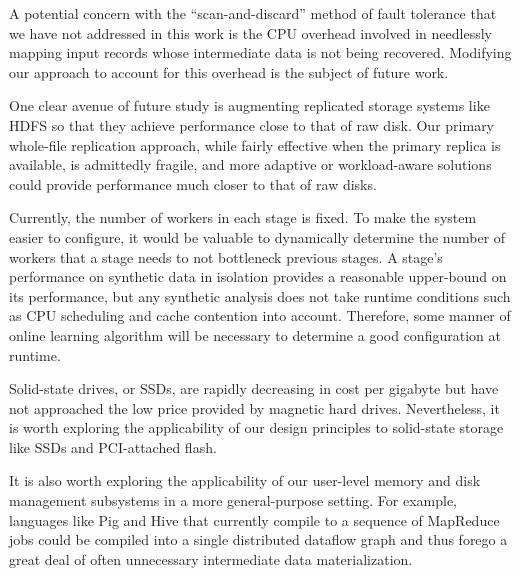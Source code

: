 A potential concern with the ``scan-and-discard'' method of fault tolerance
that we have not addressed in this work is the CPU overhead involved in
needlessly mapping input records whose intermediate data is not being
recovered. Modifying our approach to account for this overhead is the subject
of future work.

One clear avenue of future study is augmenting replicated storage systems like
HDFS so that they achieve performance close to that of raw disk. Our primary
whole-file replication approach, while fairly effective when the primary
replica is available, is admittedly fragile, and more adaptive or
workload-aware solutions could provide performance much closer to that of raw
disks.

Currently, the number of workers in each stage is fixed. To make the system
easier to configure, it would be valuable to dynamically determine the number
of workers that a stage needs to not bottleneck previous stages. A stage's
performance on synthetic data in isolation provides a reasonable upper-bound on
its performance, but any synthetic analysis does not take runtime conditions
such as CPU scheduling and cache contention into account. Therefore, some
manner of online learning algorithm will be necessary to determine a good
configuration at runtime.

Solid-state drives, or SSDs, are rapidly decreasing in cost per gigabyte but
have not approached the low price provided by magnetic hard
drives. Nevertheless, it is worth exploring the applicability of our design
principles to solid-state storage like SSDs and PCI-attached flash.

It is also worth exploring the applicability of our user-level memory
and disk management subsystems in a more general-purpose setting. For example,
languages like Pig and Hive that currently compile to a sequence of MapReduce
jobs could be compiled into a single distributed dataflow graph and thus forego
a great deal of often unnecessary intermediate data materialization.
